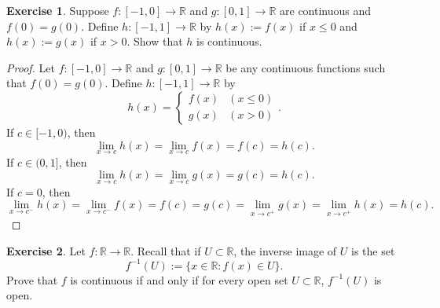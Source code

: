 \documentclass[12pt]{article}
\theoremstyle{definition}
\newtheorem{exercise}{Exercise}
\begin{document}
\begin{exercise}
    Suppose \(f : [-1, 0] \to \mathbb{R}\) and \(g : [0, 1] \to \mathbb{R}\) are continuous and \(f(0) = g(0)\). Define \(h : [-1, 1] \to \mathbb{R}\) by \(h(x) := f(x)\) if \(x \leq 0\) and \(h(x) := g(x)\) if \(x > 0\). Show that \(h\) is continuous.
\end{exercise}

\begin{proof}
    Let \(f : [-1, 0] \to \mathbb{R}\) and \(g : [0, 1] \to \mathbb{R}\) be any continuous functions such that \(f(0) = g(0)\). Define \(h : [-1, 1] \to \mathbb{R}\) by
    \[
        h(x) = \begin{cases}
            f(x) & (x \leq 0) \\
            g(x) & (x > 0)
        \end{cases}.
    \]
    If \(c \in [-1,0)\), then
    \[
        \lim_{x \to c}h(x) = \lim_{x \to c}f(x) = f(c) = h(c).
    \]
    If \(c \in (0, 1]\), then
    \[
        \lim_{x \to c}h(x) = \lim_{x \to c}g(x) = g(c) = h(c).
    \]
    If \(c = 0\), then
    \[
        \lim_{x \to c^{-}}h(x) = \lim_{x \to c^{-}}f(x) = f(c) = g(c) = \lim_{x \to c^{+}}g(x) = \lim_{x \to c^{+}}h(x) = h(c).
    \]
\end{proof}

\begin{exercise}
    Let \(f : \mathbb{R} \to \mathbb{R}\). Recall that if \(U \subset \mathbb{R}\), the inverse image of \(U\) is the set
    \[
        f^{-1}(U) := \{x \in \mathbb{R} : f(x) \in U\}.
    \]
    Prove that \(f\) is continuous if and only if for every open set \(U \subset \mathbb{R}\), \(f^{-1}(U)\) is open.
\end{exercise}
\end{document}
